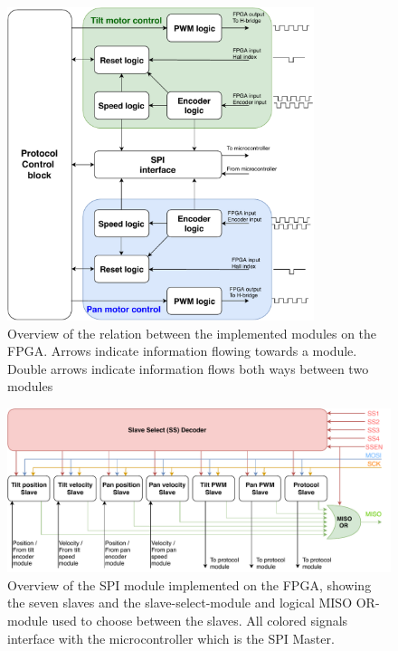 \documentclass[../../main.tex]{subfiles}
\begin{document}
\begin{figure}
    \centering
    \includegraphics[width=0.8\textwidth]{Sections/System_Implementation/Images/FPGALogicBothMotors.pdf}
    \caption{Overview of the relation between the implemented modules on the FPGA. Arrows indicate information flowing towards a module. Double arrows indicate information flows both ways between two modules}
    \label{fig:FPGALogicBothMotors}
\end{figure}

\begin{figure}[H]
    \centering
    \includegraphics[width=\textwidth]{Sections/System_Implementation/Images/SPILogicSimple.pdf}
    \caption{Overview of the SPI module implemented on the FPGA, showing the seven slaves and the slave-select-module and logical MISO OR-module used to choose between the slaves. All colored signals interface with the microcontroller which is the SPI Master. } %
    \label{fig:SPILogicSimple}
\end{figure}
\end{document}
